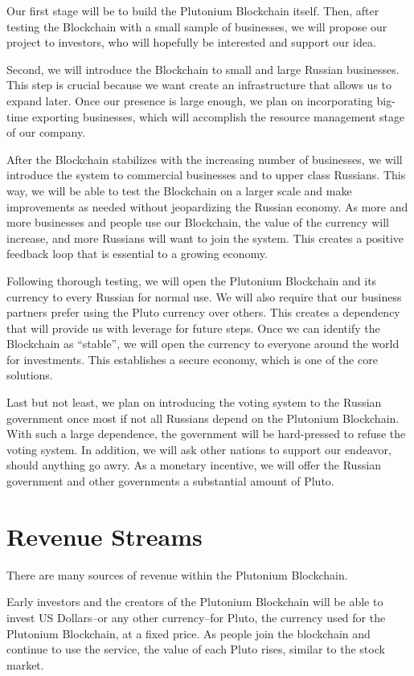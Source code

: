 \documentclass[12pt]{article}
\begin{document}
Our first stage will be to build the Plutonium Blockchain itself. Then, after testing the Blockchain with a small sample of businesses, we will propose our project to investors, who will hopefully be interested and support our idea.

Second, we will introduce the Blockchain to small and large Russian businesses. This step is crucial because we want create an infrastructure that allows us to expand later. Once our presence is large enough, we plan on incorporating big-time exporting businesses, which will accomplish the resource management stage of our company.

After the Blockchain stabilizes with the increasing number of businesses, we will introduce the system to commercial businesses and to upper class Russians. This way, we will be able to test the Blockchain on a larger scale and make improvements as needed without jeopardizing the Russian economy. As more and more businesses and people use our Blockchain, the value of the currency will increase, and more Russians will want to join the system. This creates a positive feedback loop that is essential to a growing economy. 

Following thorough testing, we will open the Plutonium Blockchain and its currency to every Russian for normal use. We will also require that our business partners prefer using the Pluto currency over others. This creates a dependency that will provide us with leverage for future steps. Once we can identify the Blockchain as ``stable'', we will open the currency to everyone around the world for investments. This establishes a secure economy, which is one of the core solutions.

Last but not least, we plan on introducing the voting system to the Russian government once most if not all Russians depend on the Plutonium Blockchain. With such a large dependence, the government will be hard-pressed to refuse the voting system. In addition, we will ask other nations to support our endeavor, should anything go awry. As a monetary incentive, we will offer the Russian government and other governments a substantial amount of Pluto.
\pagebreak
\section{Revenue Streams}
There are many sources of revenue within the Plutonium Blockchain.

Early investors and the creators of the Plutonium Blockchain will be able to invest US Dollars--or any other currency--for Pluto, the currency used for the Plutonium Blockchain, at a fixed price. As people join the blockchain and continue to use the service, the value of each Pluto rises, similar to the stock market.
\end{document}
